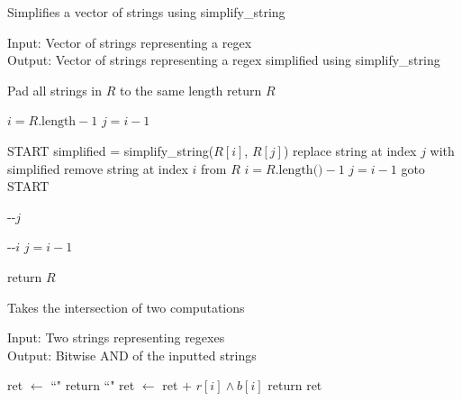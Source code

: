 \documentclass[runningheads]{llncs}
\begin{document}
\begin{algorithm}[H]
\caption{Simplifies a vector of strings using simplify\_string}
Input: Vector of strings representing a regex\\
Output: Vector of strings representing a regex simplified using simplify\_string
\begin{algorithmic}

    \State Pad all strings in $R$ to the same length 
        \State return $R$ 
        \EndIf
    
    \State $i = R\text{.length} - 1$
    \State $j = i - 1$
    
    \State START
            \State simplified = simplify\_string($R[i]$, $R[j]$) 
                \State replace string at index $j$ with simplified 
                \State remove string at index $i$ from $R$ 
                \State $i = R\text{.length()} - 1$
                \State $j = i - 1$
                \State goto START
                \EndIf
                
            \State -{}-$j$
            \EndWhile
            
        \State -{}-$i$
        \State $j = i - 1$
        \EndWhile
        
    \State return $R$
\EndProcedure
\end{algorithmic}
\end{algorithm}

\begin{algorithm}[H]
\caption{Takes the intersection of two computations}
Input: Two strings representing regexes\\
Output: Bitwise AND of the inputted strings
\begin{algorithmic}
    \State ret $\leftarrow$ ``" 
        \State return ``" 
        \Else 
        \State ret $\leftarrow$ ret $+$ $r[i] \land b[i]$ 
        \EndIf
    \EndFor
    \State return ret
\EndProcedure
\end{algorithmic}
\end{algorithm}
\end{document}
